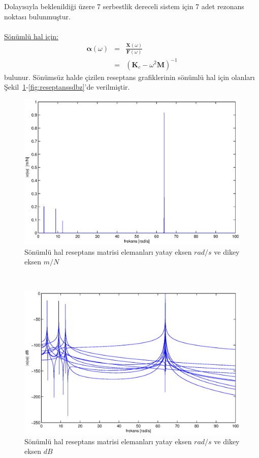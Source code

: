 \documentclass[a4paper]{report}
\begin{document}
Dolayısıyla beklenildiği üzere 7 serbestlik dereceli sistem için 7 adet rezonans noktası bulunmuştur.\\~\\
\underline{Sönümlü hal için:}
\begin{eqnarray*}
\mathbf{\alpha}\left(\omega\right)&=&\frac{\mathbf{X}\left(\omega\right)}{\mathbf{F}\left(\omega\right)}\\
&=&\left(\mathbf{K}_c-\omega^2\mathbf{M}\right)^{-1}
\end{eqnarray*}
bulunur. Sönümsüz halde çizilen reseptans grafiklerinin sönümlü hal için olanları Şekil~\ref{fig:reseptanss}-\ref{fig:reseptanssdbz}'de verilmiştir.
\clearpage
\begin{figure}[H]
\shorthandoff{=}
\centerline{
{\includegraphics[width=1.3\textwidth]{./reseptanss.eps}}}
\caption[Sönümlü hal reseptans matrisi elemanları]{Sönümlü hal reseptans matrisi elemanları yatay eksen ${rad}/{s}$ ve dikey eksen ${m}/{N}$}
\label{fig:reseptanss}
\end{figure}
~\\
\begin{figure}[H]
\shorthandoff{=}
\centerline{
{\includegraphics[width=1.3\textwidth]{./reseptanssdB.eps}}}
\caption[Sönümlü hal reseptans matrisi elemanları]{Sönümlü hal reseptans matrisi elemanları yatay eksen ${rad}/{s}$ ve dikey eksen $dB$ }
\label{fig:reseptanssdb}
\end{figure}
\end{document}

